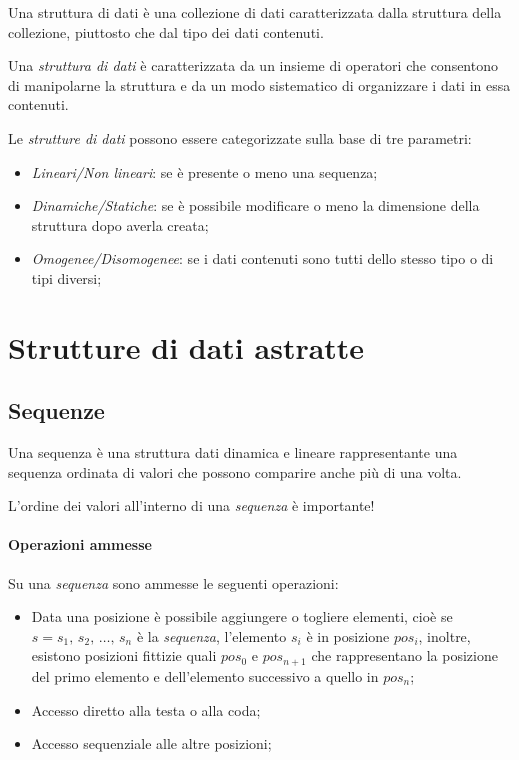 \begin{definition}
    Una struttura di dati è una collezione di dati caratterizzata dalla struttura
    della collezione, piuttosto che dal tipo dei dati contenuti.
\end{definition}\noindent
Una \emph{struttura di dati} è caratterizzata da un insieme di operatori che
consentono di manipolarne la struttura e da un modo sistematico di organizzare i
dati in essa contenuti.

Le \emph{strutture di dati} possono essere categorizzate sulla base di tre
parametri:
\begin{itemize}
    \item \emph{Lineari/Non lineari}: se è presente o meno una sequenza;
    \item \emph{Dinamiche/Statiche}: se è possibile modificare o meno la dimensione
    della struttura dopo averla creata;
    \item \emph{Omogenee/Disomogenee}: se i dati contenuti sono tutti dello stesso
    tipo o di tipi diversi;
\end{itemize}

\section{Strutture di dati astratte}
\subsection{Sequenze}
\begin{definition}[Sequenza]
    Una sequenza è una struttura dati dinamica e lineare rappresentante una
    sequenza ordinata di valori che possono comparire anche più di una volta.
\end{definition}
\begin{note}
    L'ordine dei valori all'interno di una \emph{sequenza} è importante!
\end{note}

\paragraph{Operazioni ammesse}
Su una \emph{sequenza} sono ammesse le seguenti operazioni:
\begin{itemize}
    \item Data una posizione è possibile aggiungere o togliere elementi, cioè
    se $s=s_1,\,s_2,\,\dots,\,s_n$ è la \emph{sequenza}, l'elemento $s_i$ è in
    posizione $pos_i$, inoltre, esistono posizioni fittizie quali $pos_0$ e
    $pos_{n+1}$ che rappresentano la posizione del primo elemento e dell'elemento
    successivo a quello in $pos_n$;
    \item Accesso diretto alla testa o alla coda;
    \item Accesso sequenziale alle altre posizioni;
\end{itemize}

